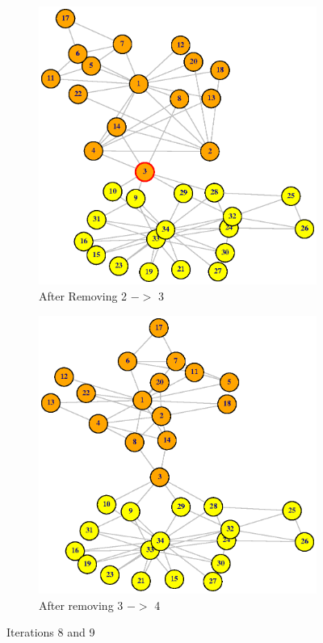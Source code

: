 \documentclass[12pt,letterpaper]{article}
\begin{document}
%
\begin{figure}
\centering
\begin{subfigure}{.5\textwidth}
  \centering
  \includegraphics[width=.9\linewidth]{Plot9}
  \caption{After Removing 2 $->$ 3 }
  \label{fig:sub1}
\end{subfigure}%
\begin{subfigure}{.5\textwidth}
  \centering
  \includegraphics[width=.9\linewidth]{Plot10}
  \caption{After removing 3 $->$ 4}
  \label{fig:sub2}
\end{subfigure}
\caption{Iterations 8 and 9}
\label{fig:test}
\end{figure}
\end{document}
